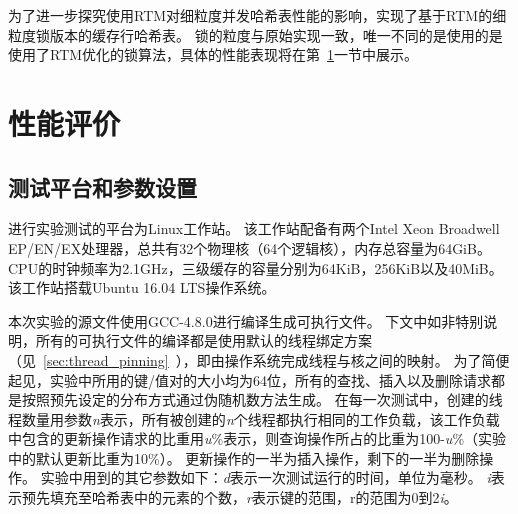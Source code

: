 为了进一步探究使用RTM对细粒度并发哈希表性能的影响，实现了基于RTM的细粒度锁版本的缓存行哈希表。
锁的粒度与原始实现一致，唯一不同的是使用的是使用了RTM优化的锁算法，具体的性能表现将在第~\ref{sec:rtm-eva}一节中展示。


\section{性能评价}
\label{sec:rtm-eva}
\subsection{测试平台和参数设置}
进行实验测试的平台为Linux工作站。
该工作站配备有两个Intel Xeon Broadwell EP/EN/EX处理器，总共有32个物理核（64个逻辑核），内存总容量为64GiB。
CPU的时钟频率为2.1GHz，三级缓存的容量分别为64KiB，256KiB以及40MiB。
该工作站搭载Ubuntu 16.04 LTS操作系统。

本次实验的源文件使用GCC-4.8.0进行编译生成可执行文件。
下文中如非特别说明，所有的可执行文件的编译都是使用默认的线程绑定方案（见~\ref{sec:thread_pinning}~），即由操作系统完成线程与核之间的映射。
为了简便起见，实验中所用的键/值对的大小均为64位，所有的查找、插入以及删除请求都是按照预先设定的分布方式通过伪随机数方法生成。
在每一次测试中，创建的线程数量用参数\textit{n}表示，所有被创建的\textit{n}个线程都执行相同的工作负载，该工作负载中包含的更新操作请求的比重用\textit{u}\%表示，则查询操作所占的比重为100-\textit{u}\%（实验中的默认更新比重为10\%）。
更新操作的一半为插入操作，剩下的一半为删除操作。
实验中用到的其它参数如下：\textit{d}表示一次测试运行的时间，单位为毫秒。
\textit{i}表示预先填充至哈希表中的元素的个数，\textit{r}表示键的范围，r的范围为0到2\textit{i}。

